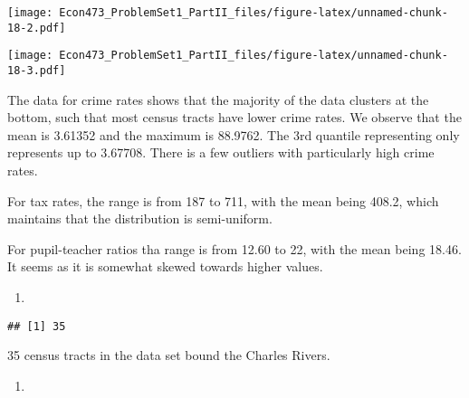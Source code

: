 \documentclass[
]{article}
\newenvironment{Shaded}{\begin{snugshade}}{\end{snugshade}}
\newcommand{\AttributeTok}[1]{\textcolor[rgb]{0.13,0.29,0.53}{#1}}
\newcommand{\DecValTok}[1]{\textcolor[rgb]{0.00,0.00,0.81}{#1}}
\newcommand{\FunctionTok}[1]{\textcolor[rgb]{0.13,0.29,0.53}{\textbf{#1}}}
\newcommand{\NormalTok}[1]{#1}
\newcommand{\SpecialCharTok}[1]{\textcolor[rgb]{0.81,0.36,0.00}{\textbf{#1}}}
\newcommand{\StringTok}[1]{\textcolor[rgb]{0.31,0.60,0.02}{#1}}
\providecommand{\tightlist}{%
  \setlength{\itemsep}{0pt}\setlength{\parskip}{0pt}}
\begin{document}
\texttt{[image: Econ473\_ProblemSet1\_PartII\_files/figure-latex/unnamed-chunk-18-2.pdf]}

\begin{Shaded}
\end{Shaded}

\texttt{[image: Econ473\_ProblemSet1\_PartII\_files/figure-latex/unnamed-chunk-18-3.pdf]}

The data for crime rates shows that the majority of the data clusters at
the bottom, such that most census tracts have lower crime rates. We
observe that the mean is 3.61352 and the maximum is 88.9762. The 3rd
quantile representing only represents up to 3.67708. There is a few
outliers with particularly high crime rates.

For tax rates, the range is from 187 to 711, with the mean being 408.2,
which maintains that the distribution is semi-uniform.

For pupil-teacher ratios tha range is from 12.60 to 22, with the mean
being 18.46. It seems as it is somewhat skewed towards higher values.

\begin{enumerate}
\def\labelenumi{(\alph{enumi})}
\setcounter{enumi}{4}
\tightlist
\item
\end{enumerate}

\begin{Shaded}
\end{Shaded}

\begin{verbatim}
## [1] 35
\end{verbatim}

35 census tracts in the data set bound the Charles Rivers.

\begin{enumerate}
\def\labelenumi{(\alph{enumi})}
\setcounter{enumi}{5}
\tightlist
\item
\end{enumerate}

\begin{Shaded}
\end{Shaded}
\end{document}
